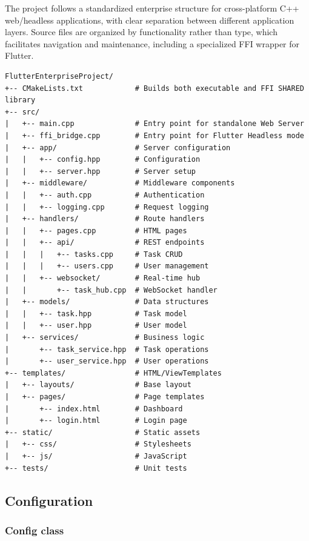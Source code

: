 The project follows a standardized enterprise structure for cross-platform C++ web/headless applications, with clear separation between different application layers. Source files are organized by functionality rather than type, which facilitates navigation and maintenance, including a specialized FFI wrapper for Flutter.

\begin{lstlisting}[basicstyle=\small\ttfamily, frame=none, numbers=none]
FlutterEnterpriseProject/
+-- CMakeLists.txt            # Builds both executable and FFI SHARED library
+-- src/
|   +-- main.cpp              # Entry point for standalone Web Server
|   +-- ffi_bridge.cpp        # Entry point for Flutter Headless mode
|   +-- app/                  # Server configuration
|   |   +-- config.hpp        # Configuration
|   |   +-- server.hpp        # Server setup
|   +-- middleware/           # Middleware components
|   |   +-- auth.cpp          # Authentication
|   |   +-- logging.cpp       # Request logging
|   +-- handlers/             # Route handlers
|   |   +-- pages.cpp         # HTML pages
|   |   +-- api/              # REST endpoints
|   |   |   +-- tasks.cpp     # Task CRUD
|   |   |   +-- users.cpp     # User management
|   |   +-- websocket/        # Real-time hub
|   |       +-- task_hub.cpp  # WebSocket handler
|   +-- models/               # Data structures
|   |   +-- task.hpp          # Task model
|   |   +-- user.hpp          # User model
|   +-- services/             # Business logic
|       +-- task_service.hpp  # Task operations
|       +-- user_service.hpp  # User operations
+-- templates/                # HTML/ViewTemplates
|   +-- layouts/              # Base layout
|   +-- pages/                # Page templates
|       +-- index.html        # Dashboard
|       +-- login.html        # Login page
+-- static/                   # Static assets
|   +-- css/                  # Stylesheets
|   +-- js/                   # JavaScript
+-- tests/                    # Unit tests
\end{lstlisting}

\subsection{Configuration}

\subsubsection{Config class}


